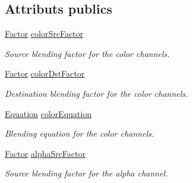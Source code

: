 \subsection*{Attributs publics}
\begin{DoxyCompactItemize}
\item 
\mbox{\label{structsf_1_1BlendMode_a32d1a55dbfada86a06d9b881dc8ccf7b}} 
\hyperlink{structsf_1_1BlendMode_afb9852caf356b53bb0de460c58a9ebbb}{Factor} \hyperlink{structsf_1_1BlendMode_a32d1a55dbfada86a06d9b881dc8ccf7b}{color\+Src\+Factor}
\begin{DoxyCompactList}\small\item\em Source blending factor for the color channels. \end{DoxyCompactList}\item 
\mbox{\label{structsf_1_1BlendMode_adee68ee59e7f1bf71d12db03d251104d}} 
\hyperlink{structsf_1_1BlendMode_afb9852caf356b53bb0de460c58a9ebbb}{Factor} \hyperlink{structsf_1_1BlendMode_adee68ee59e7f1bf71d12db03d251104d}{color\+Dst\+Factor}
\begin{DoxyCompactList}\small\item\em Destination blending factor for the color channels. \end{DoxyCompactList}\item 
\mbox{\label{structsf_1_1BlendMode_aed12f06eb7f50a1b95b892b0964857b1}} 
\hyperlink{structsf_1_1BlendMode_a7bce470e2e384c4f9c8d9595faef7c32}{Equation} \hyperlink{structsf_1_1BlendMode_aed12f06eb7f50a1b95b892b0964857b1}{color\+Equation}
\begin{DoxyCompactList}\small\item\em Blending equation for the color channels. \end{DoxyCompactList}\item 
\mbox{\label{structsf_1_1BlendMode_aa94e44f8e1042a7357e8eff78c61a1be}} 
\hyperlink{structsf_1_1BlendMode_afb9852caf356b53bb0de460c58a9ebbb}{Factor} \hyperlink{structsf_1_1BlendMode_aa94e44f8e1042a7357e8eff78c61a1be}{alpha\+Src\+Factor}
\begin{DoxyCompactList}\small\item\em Source blending factor for the alpha channel. \end{DoxyCompactList}\item 

\end{DoxyCompactItemize}
